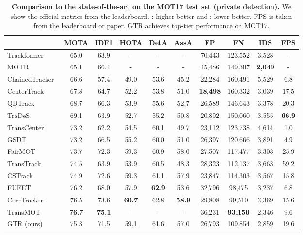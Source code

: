 \documentclass[10pt,twocolumn,letterpaper]{article}
\newcommand{\lbltbl}[1]{\label{tbl:#1}}
\begin{document}
\begin{table*}
\centering
\begin{tabular}{@{}l@{}c@{\ \ \ }c@{\ \ \ }c@{\ \ \ }c@{\ \ \ }c@{\ \ \ }c@{\ \ }c@{\ \ \ }c@{\ \ \ }c@{}}
\toprule
  & MOTA & IDF1 & HOTA & DetA & AssA & FP & FN & IDS & FPS \\
\midrule
Trackformer~\cite{meinhardt2021trackformer} & 65.0  & 63.9 & - & - & - & 70,443 & 123,552 & 3,528 & -\\
MOTR~\cite{zeng2021motr} & 65.1 & 66.4 & - & - & - & 45,486 & 149,307 & \bf 2,049  & - \\
ChainedTracker~\cite{peng2020chained} & 66.6 & 57.4 & 49.0 & 53.6 & 45.2 & 22,284 & 160,491 & 5,529  & 6.8 \\
CenterTrack~\cite{zhou2020tracking} & 67.8 & 64.7 & 52.2 & 53.8 & 51.0 & \bf 18,498 & 160,332 & 3,039  & 17.5 \\
QDTrack~\cite{qdtrack} & 68.7 & 66.3 & 53.9 & 55.6 & 52.7 & 26,589 & 146,643 & 3,378  & 20.3 \\
TraDeS~\cite{Wu2021TraDeS} & 69.1  & 63.9 & 52.7 & 55.2 & 50.8 & 20,892 & 150,060 &  3,555 & \bf 66.9\\
TransCenter~\cite{xu2021transcenter} & 73.2  & 62.2 & 54.5 & 60.1 & 49.7 & 23,112 & 123,738 & 4,614 & 1.0 \\
GSDT~\cite{wang2020joint} & 73.2  & 66.5 & 55.2 & 60.0 & 51.0 & 26,397 & 120,666 & 3,891 & 4.9\\
FairMOT~\cite{zhang2020fair} & 73.7 & 72.3 & 59.3 & 60.9 & 58.0 & 27,507 & 117,477 & 3,303  & 25.9\\
TransTrack~\cite{transtrack} & 74.5 & 63.9 & 53.9 & 60.5 & 48.3 & 28,323 & 112,137 & 3,663  & 59.2 \\
CSTrack~\cite{liang2020rethinking} & 74.9 & 72.6 & 59.3 & 61.1 & 57.9 & 23,847 & 114,303 & 3,567 & 15.8 \\
FUFET~\cite{shan2020fgagt} & 76.2 & 68.0 & 57.9 & \bf 62.9 & 53.6 & 32,796 & 98,475 & 3,237  & 6.8\\
CorrTracker~\cite{wang2021multiple} & 76.5 & 73.6 & \bf 60.7 & 62.8  & \bf 58.9 & 29,808 & 99,510 & 3,369 & 15.6\\
TransMOT~\cite{chu2021transmot} & \bf 76.7 & \bf 75.1 & - & - & - & 36,231 & \bf 93,150 & 2,346 & 9.6 \\ 
GTR (ours) & 75.3 &  71.5 & 59.1 & 61.6 & 57.0 & 26,793 & 109,854 & 2,859 & 19.6\\ 
\bottomrule
\end{tabular}
\vspace{-3mm}
\caption{
\textbf{Comparison to the state-of-the-art on the MOT17 test set (private detection).} 
We show the official metrics from the leaderboard. : higher better and : lower better. FPS is taken from the leaderboard or paper. GTR achieves top-tier performance on MOT17.
}
\vspace{-3mm}
\lbltbl{mot17test}
\end{table*}
\end{document}
